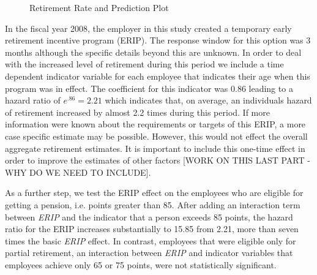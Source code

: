 \documentclass[12pt,letterpaper]{article}
\begin{document}
\begin{figure}[h!]
	\centering
	\caption{Retirement Rate and Prediction Plot}
	\label{fig:rerate}
\end{figure}

In the fiscal year 2008, the employer in this study created a temporary early retirement incentive program (ERIP). The response window for this option was 3 months although the specific details beyond this are unknown. In order to deal with the increased level of retirement during this period we include a time dependent indicator variable for each employee that indicates their age when this program was in effect.  The coefficient for this indicator was 0.86 leading to a hazard ratio of $e^{.86} = 2.21$ which indicates that, on average, an individuals hazard of retirement increased by almost 2.2 times during this period.  If more information were known about the requirements or targets of this ERIP, a more case specific estimate may be possible.  However, this would not effect the overall aggregate retirement estimates.  It is important to include this one-time effect in order to improve the estimates of other factors [WORK ON THIS LAST PART - WHY DO WE NEED TO INCLUDE].

As a further step, we test the ERIP effect on the employees who are eligible for getting a pension, i.e. points greater than 85.  After adding an interaction term between {\it ERIP} and the indicator that a person exceeds 85 points, the hazard ratio for the ERIP increases substantially to 15.85 from 2.21, more than seven times the basic {\it ERIP} effect.  In contrast, employees that were eligible only for partial retirement, an interaction between {\it ERIP} and indicator variables that employees achieve only 65 or 75 points, were not statistically significant.
\end{document}
